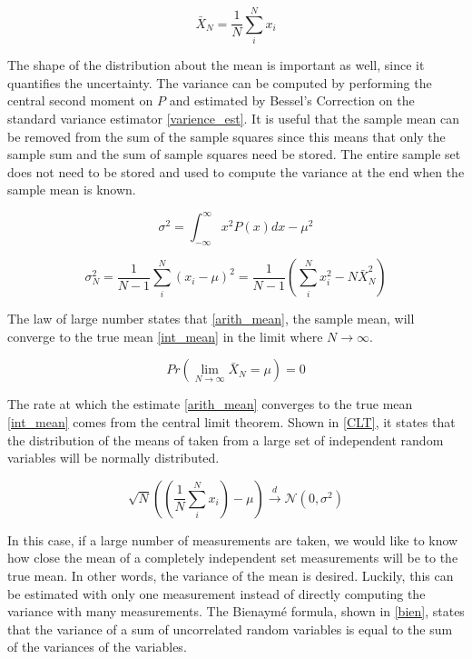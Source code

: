 \begin{equation}
\label{arith_mean}
\bar{X}_N = \frac{1}{N} \sum_i^N x_i
\end{equation}

The shape of the distribution about the mean is important as well, since it quantifies the uncertainty.  The variance can be computed by performing the central second moment on $P$ and estimated by Bessel's Correction on the standard variance estimator \eqref{varience_est}\cite{}.  It is useful that the sample mean can be removed from the sum of the sample squares since this means that only the sample sum and the sum of sample squares need be stored.  The entire sample set does not need to be stored and used to compute the variance at the end when the sample mean is known.

\begin{equation}
\label{varience}
\sigma^2 = \int_{-\infty}^{\infty} x^2 P(x) dx- \mu^2
\end{equation}

\begin{equation}
\label{varience_est}
\sigma_N^2 =  \frac{1}{N-1} \sum_i^N (x_i-\mu)^2 =  \frac{1}{N-1} \left( \sum_i^N x_i^2-N\bar{X}_N^2 \right)
\end{equation}

The law of large number states that \eqref{arith_mean}, the sample mean, will converge to the true mean \eqref{int_mean} in the limit where $N\rightarrow\infty$.  

\begin{equation}
\label{LLN}
Pr\left(\lim_{N\rightarrow\infty} \bar{X}_N = \mu \right) =0
\end{equation}

The rate at which the estimate \eqref{arith_mean} converges to the true mean \eqref{int_mean} comes from the central limit theorem.  Shown in \eqref{CLT}, it states that the distribution of the means of taken from a large set of independent random variables will be normally distributed.  

\begin{equation}
\label{CLT}
\sqrt{N}\left(\left(\frac{1}{N} \sum_i^N x_i \right)-\mu\right) \xrightarrow[]{d} \mathcal{N}(0,\sigma^2)
\end{equation}

In this case, if a large number of measurements are taken, we would like to know how close the mean of a completely independent set measurements will be to the true mean.  In other words, the variance of the mean is desired.  Luckily, this can be estimated with only one measurement instead of directly computing the variance with many measurements.  The Bienaym\'e formula, shown in \eqref{bien}, states that the variance of a sum of uncorrelated random variables is equal to the sum of the variances of the variables.

